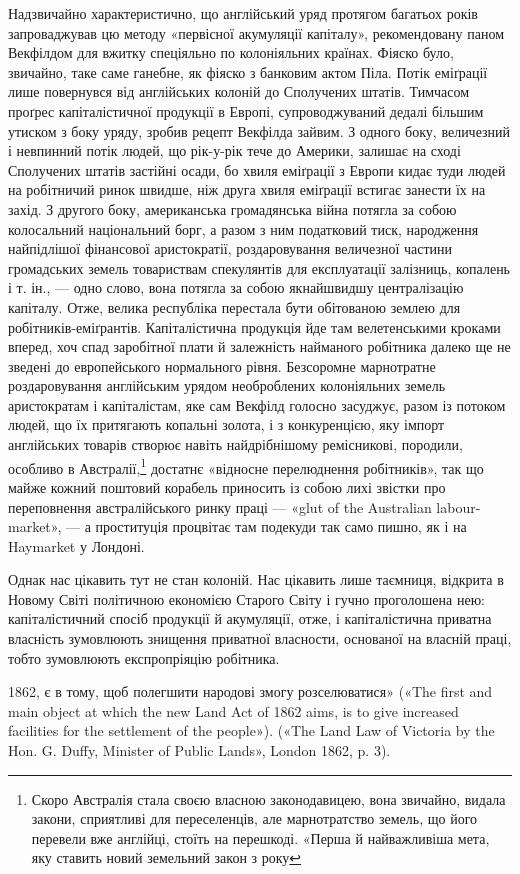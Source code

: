 Надзвичайно характеристично, що англійський уряд протягом багатьох років запроваджував цю методу
«первісної акумуляції капіталу», рекомендовану паном Векфілдом для вжитку спеціяльно по колоніяльних
країнах. Фіяско було, звичайно, таке саме ганебне, як фіяско з банковим актом Піла. Потік еміґрації
лише повернувся від англійських колоній до Сполучених штатів. Тимчасом проґрес капіталістичної
продукції в Европі, супроводжуваний дедалі більшим утиском з боку уряду, зробив рецепт Векфілда
зайвим. З одного боку, величезний і невпинний потік людей, що рік-у-рік тече до Америки, залишає на
сході Сполучених штатів застійні осади, бо хвиля еміґрації з Европи кидає туди людей на робітничий
ринок швидше, ніж друга хвиля еміґрації встигає занести їх на захід. З другого боку, американська
громадянська війна потягла за собою колосальний національний борг, а разом з ним податковий тиск,
народження найпідлішої фінансової аристократії, роздаровування величезної частини громадських земель
товариствам спекулянтів для експлуатації залізниць, копалень і т. ін., — одно слово, вона потягла за
собою якнайшвидшу централізацію капіталу. Отже, велика республіка перестала бути обітованою землею
для робітників-еміґрантів. Капіталістична продукція йде там велетенськими кроками вперед, хоч спад
заробітної плати й залежність найманого робітника далеко ще не зведені до европейського нормального
рівня. Безсоромне марнотратне роздаровування англійським урядом необроблених колоніяльних земель
аристократам і капіталістам, яке сам Векфілд голосно засуджує, разом із потоком людей, що їх
притягають копальні золота, і з конкуренцією, яку імпорт англійських товарів створює навіть
найдрібнішому ремісникові, породили, особливо в Австралії,\footnote{
Скоро Австралія стала своєю власною законодавицею, вона звичайно, видала закони, сприятливі для
переселенців, але марнотратство земель, що його перевели вже англійці, стоїть на перешкоді. «Перша й
найважливіша мета, яку ставить новий земельний закон з року
} достатнє «відносне перелюднення
робітників», так що майже кожний поштовий корабель приносить із собою лихі звістки про
переповнення австралійського ринку праці — «glut of the Australian labour-market», — а проституція
процвітає там подекуди так само пишно, як і на Haymarket у Лондоні.

Однак нас цікавить тут не стан колоній. Нас цікавить лише таємниця, відкрита в Новому Світі
політичною економією Старого Світу і гучно проголошена нею: капіталістичний спосіб продукції й
акумуляції, отже, і капіталістична приватна власність зумовлюють знищення приватної власности,
основаної на власній праці, тобто зумовлюють експропріяцію робітника.

1862, є в тому, щоб полегшити народові змогу розселюватися» («The first and main object at which the
new Land Act of 1862 aims, is to give increased facilities for the settlement of the people»). («The
Land Law of Victoria by the Hon. G. Duffy, Minister of Public Lands», London 1862, p. 3).
\parbreak{}  %
